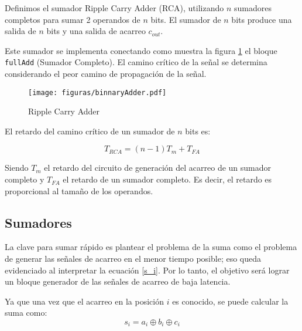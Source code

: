 Definimos el sumador Ripple Carry Adder (RCA), utilizando \(n\) sumadores completos para sumar 2 operandos de \(n\) bits. El sumador de \(n\) bits produce una salida de \(n\) bits y una salida de acarreo \(c_{out}\).

Este sumador se implementa conectando como muestra la figura \ref{fig:RCA} el bloque \verb.fullAdd. (Sumador Completo). El camino crítico de la señal se determina considerando el peor camino de propagación de la señal.  

\begin{figure}[h]
  \centering
\texttt{[image: figuras/binnaryAdder.pdf]}
  \caption{Ripple Carry Adder}
  \label{fig:RCA}
\end{figure}

El retardo del camino crítico de un sumador de $n$ bits es:

\begin{equation}
T_{RCA} = (n-1)T_m+ T_{FA}
\end{equation}

Siendo $T_m$ el retardo del circuito de generación del acarreo de un sumador completo y $T_{FA}$ el retardo de un sumador completo. Es decir, el retardo es proporcional al tamaño de los operandos.

 

\subsection{Sumadores }

La clave para sumar rápido es plantear el problema de la suma como el problema de generar las señales de acarreo en el menor tiempo posible; eso queda evidenciado al interpretar la ecuación \ref{s_i}. Por lo tanto, el objetivo será lograr un bloque generador de las señales de acarreo de baja latencia\cite{arithmeticComputer}.

Ya que una vez que el acarreo en la posición \(i\) es conocido, se puede calcular la suma como:
\begin{equation}\label{s_i}
s_i = a_i \oplus b_i\oplus c_i
\end{equation}

